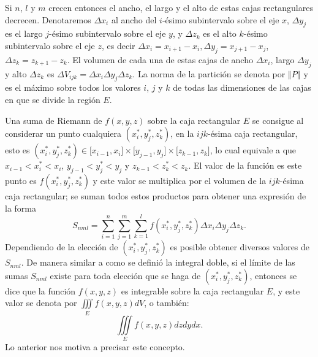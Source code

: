 Si $n$, $l$ y $m$ crecen entonces el ancho, el largo y el alto de estas
cajas rectangulares decrecen.
Denotaremos $\Delta x_{i}$ al ancho del $i$-ésimo subintervalo sobre el
eje $x$, $\Delta y_{j}$ es el largo $j$-ésimo subintervalo sobre el eje $y$, y $\Delta z_{k}$ es el alto $k$-ésimo subintervalo sobre el eje $z$, es decir $\Delta x_{i}=x_{i+1}-x_{i},\Delta y_{j}=x_{j+1}-x_{j}$, $\Delta
z_{k}=z_{k+1}-z_{k}$.
El volumen de cada una de estas cajas de ancho $\Delta x_{i}$, largo $\Delta y_{j}$ y alto $\Delta z_{k}$ es
$\Delta V_{ijk}=\Delta x_{i}\Delta y_{j}\Delta z_{k}$.
La norma de la partición se denota por $\left\Vert P\right\Vert $ y es
el máximo sobre todos los valores $i$, $j$ y $k$ de todas las
dimensiones de las cajas en que se divide la región $E$.

Una suma de Riemann de $f(x,y,z) $ sobre la caja rectangular $E$ se consigue al considerar un punto cualquiera
$\left( x_{i}^{\ast},y_{j}^{\ast },z_{k}^{\ast }\right) $, en la $ijk$-ésima caja
rectangular, esto es $\left( x_{i}^{\ast },y_{j}^{\ast },z_{k}^{\ast}\right) \in \lbrack x_{i-1},x_{i}]\times \lbrack y_{j-1},y_{j}]\times \lbrack z_{k-1},z_{k}]$, lo cual equivale a que $x_{i-1}<x_{i}^{\ast }<x_{i}$,
$y_{j-1}<y_{j}^{\ast }<y_{j}$ y $z_{k-1}<z_{k}^{\ast }<z_{k}$. El valor de la
función es este punto es $f\left( x_{i}^{\ast },y_{j}^{\ast},z_{k}^{\ast }\right) $
y este valor se multiplica por el volumen de la $ijk$-ésima caja rectangular; se suman todos estos productos para obtener
una expresión de la forma
\begin{equation*}
S_{nml}=\sum_{i=1}^{n}\sum_{j=1}^{m}\sum_{k=1}^{l}f\left( x_{i}^{\ast},y_{j}^{\ast },z_{k}^{\ast }\right) \Delta x_{i}\Delta y_{j}\Delta z_{k}.
\end{equation*}
Dependiendo de la elección de $\left( x_{i}^{\ast },y_{j}^{\ast },z_{k}^{\ast }\right)$
es posible obtener diversos valores de $S_{nml}$.
De manera similar a como se definió la integral doble, si el límite de
las sumas $S_{nml}$ existe para toda elección que se haga de
$\left(x_{i}^{\ast },y_{j}^{\ast },z_{k}^{\ast }\right)$, entonces se dice que la
función $f(x,y,z) $ es integrable sobre la caja rectangular $E$, y este valor se denota por $\iiint\limits_{E}f(x,y,z) dV$, o también:
\[\iiint\limits_{E}f(x,y,z) dzdydx.\]
Lo anterior nos motiva a precisar este concepto.

